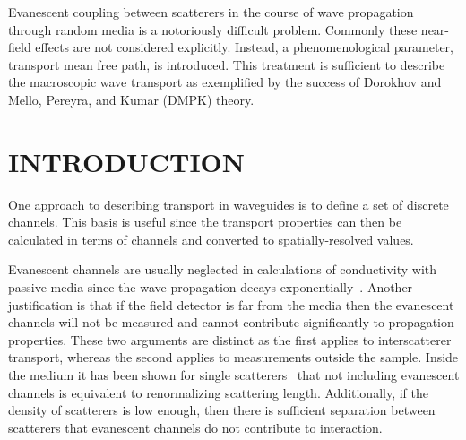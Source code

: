 Evanescent coupling between scatterers in the course of wave propagation through random media is a notoriously difficult problem. Commonly these near-field effects are not considered explicitly. Instead, a phenomenological parameter, transport mean free path, is introduced. This treatment is sufficient to describe the macroscopic wave transport as exemplified by the success of Dorokhov and Mello, Pereyra, and Kumar (DMPK) theory. 
% 
% 
% 
% 
% 

\section{INTRODUCTION}
One approach to describing transport in waveguides is to define a set of discrete channels. This basis is useful since the transport properties can then be calculated in terms of channels and converted to spatially-resolved values.

Evanescent channels are usually neglected in calculations of conductivity with passive media since the wave propagation decays exponentially~\cite{1982_Dorokhov_DMPK,1988_Mello_Kumar_DMPK}. Another justification is that if the field detector is far from the media then the evanescent channels will not be measured and cannot contribute significantly to propagation properties. These two arguments are distinct as the first applies to interscatterer transport, whereas the second applies to measurements outside the sample. Inside the medium it has been shown for single scatterers~\cite{1990_Bagwell,1991_Kumar_Bagwell} that not including evanescent channels is equivalent to renormalizing scattering length. Additionally, if the density of scatterers is low enough, then there is sufficient separation between scatterers that evanescent channels do not contribute to interaction. 

